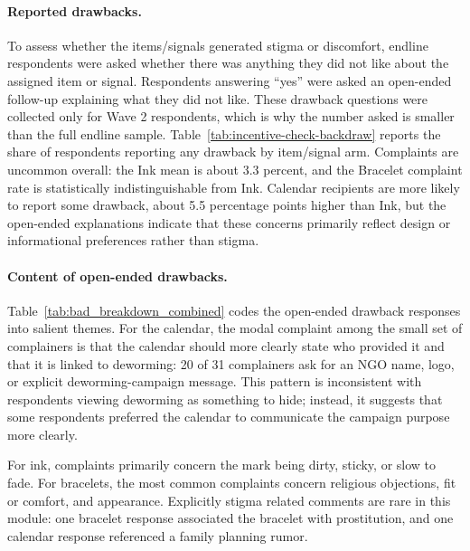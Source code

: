 \documentclass[ECM\space ReStud.tex]{subfiles}
\begin{document}
\paragraph{Reported drawbacks.}
To assess whether the items/signals generated stigma or discomfort, endline respondents were asked whether there was anything they did not like about the assigned item or signal. Respondents answering ``yes'' were asked an open-ended follow-up explaining what they did not like. These drawback questions were collected only for Wave 2 respondents, which is why the number asked is smaller than the full endline sample. Table~\ref{tab:incentive-check-backdraw} reports the share of respondents reporting any drawback by item/signal arm. Complaints are uncommon overall: the Ink mean is about 3.3 percent, and the Bracelet complaint rate is statistically indistinguishable from Ink. Calendar recipients are more likely to report some drawback, about 5.5 percentage points higher than Ink, but the open-ended explanations indicate that these concerns primarily reflect design or informational preferences rather than stigma.

\paragraph{Content of open-ended drawbacks.}
Table~\ref{tab:bad_breakdown_combined} codes the open-ended drawback responses into salient themes. For the calendar, the modal complaint among the small set of complainers is that the calendar should more clearly state who provided it and that it is linked to deworming: 20 of 31 complainers ask for an NGO name, logo, or explicit deworming-campaign message. This pattern is inconsistent with respondents viewing deworming as something to hide; instead, it suggests that some respondents preferred the calendar to communicate the campaign purpose more clearly.

For ink, complaints primarily concern the mark being dirty, sticky, or slow to fade. For bracelets, the most common complaints concern religious objections, fit or comfort, and appearance. Explicitly stigma related comments are rare in this module: one bracelet response associated the bracelet with prostitution, and one calendar response referenced a family planning rumor.
\end{document}
